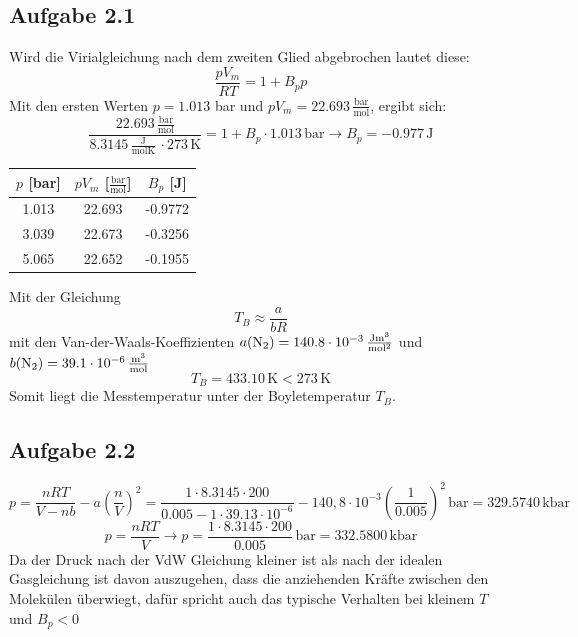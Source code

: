 \documentclass{article}
\begin{document}
\subsection*{Aufgabe 2.1}
Wird die Virialgleichung nach dem zweiten Glied abgebrochen lautet diese:
\begin{equation*}
    \frac{pV_m}{RT} = 1+B_pp
\end{equation*}
Mit den ersten Werten $p = 1.013$ bar und $pV_m = 22.693\,\mathrm{\frac{bar}{mol}}$, ergibt sich:
\begin{equation*}
    \frac{22.693\,\mathrm{\frac{bar}{mol}}}{8.3145\,\mathrm{\frac{J}{molK}}\,\cdot273\,\mathrm{K}} = 1 + B_p \cdot 1.013 \,\mathrm{bar} \rightarrow B_p = -0.977\,\mathrm{J}
\end{equation*}
\begin{center}
    \begin{tabular}{c c c}
        \hline
        $p$ [bar] & $pV_m$ [$\mathrm{\frac{bar}{mol}}$] & $B_p$ [J]\\
        \hline
        1.013&22.693&-0.9772\\
        3.039&22.673&-0.3256\\
        5.065&22.652&-0.1955\\
        \hline
    \end{tabular}
\end{center}
Mit der Gleichung
\begin{equation*}
    T_B \approx \frac{a}{bR}
\end{equation*}
mit den Van-der-Waals-Koeffizienten $a(\ce{N2}) = 140.8\cdot 10^{-3}\,\mathrm{\frac{Jm^3}{mol^2}}$ und $b(\ce{N2})=39.1\cdot 10^{-6}\,\mathrm{\frac{m^3}{mol}}$
\begin{equation*}
    T_B = 433.10\,\mathrm{K} < 273\,\mathrm{K}
\end{equation*}
Somit liegt die Messtemperatur unter der Boyletemperatur $T_B$.

\subsection*{Aufgabe 2.2}
\begin{equation*}
    p = \frac{nRT}{V-nb} - a \left(\frac{n}{V}\right)^2 = \frac{1\cdot 8.3145 \cdot 200}{0.005 - 1 \cdot 39.13 \cdot 10^{-6}}-140,8\cdot 10^{-3}\left(\frac{1}{0.005}\right)^2 \,\mathrm{bar} = 329.5740\,\mathrm{kbar}
\end{equation*}
\begin{equation*}
    p = \frac{nRT}{V} \rightarrow p = \frac{1\cdot 8.3145 \cdot 200}{0.005}\,\mathrm{bar} = 332.5800\,\mathrm{kbar}
\end{equation*}
Da der Druck nach der VdW Gleichung kleiner ist als nach der idealen Gasgleichung ist davon auszugehen, dass die anziehenden Kräfte zwischen den Molekülen überwiegt, dafür spricht auch das typische Verhalten bei kleinem $T$ und $B_p < 0$
\end{document}
